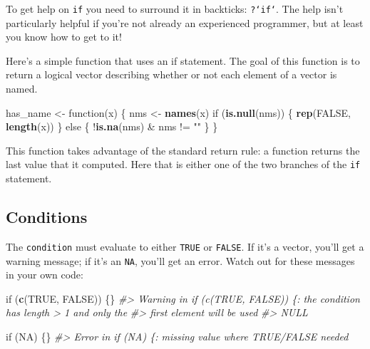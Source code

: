 \documentclass[]{book}
\newenvironment{Shaded}{\begin{snugshade}}{\end{snugshade}}
\newcommand{\KeywordTok}[1]{\textcolor[rgb]{0.13,0.29,0.53}{\textbf{{#1}}}}
\newcommand{\StringTok}[1]{\textcolor[rgb]{0.31,0.60,0.02}{{#1}}}
\newcommand{\CommentTok}[1]{\textcolor[rgb]{0.56,0.35,0.01}{\textit{{#1}}}}
\newcommand{\OtherTok}[1]{\textcolor[rgb]{0.56,0.35,0.01}{{#1}}}
\newcommand{\NormalTok}[1]{{#1}}
\begin{document}
To get help on \texttt{if} you need to surround it in backticks:
\texttt{?`if`}. The help isn't particularly helpful if you're not
already an experienced programmer, but at least you know how to get to
it!

Here's a simple function that uses an if statement. The goal of this
function is to return a logical vector describing whether or not each
element of a vector is named.

\begin{Shaded}
\begin{Highlighting}[]
\NormalTok{has_name <-}\StringTok{ }\NormalTok{function(x) \{}
  \NormalTok{nms <-}\StringTok{ }\KeywordTok{names}\NormalTok{(x)}
  \NormalTok{if (}\KeywordTok{is.null}\NormalTok{(nms)) \{}
    \KeywordTok{rep}\NormalTok{(}\OtherTok{FALSE}\NormalTok{, }\KeywordTok{length}\NormalTok{(x))}
  \NormalTok{\} else \{}
    \NormalTok{!}\KeywordTok{is.na}\NormalTok{(nms) &}\StringTok{ }\NormalTok{nms !=}\StringTok{ ""}
  \NormalTok{\}}
\NormalTok{\}}
\end{Highlighting}
\end{Shaded}

This function takes advantage of the standard return rule: a function
returns the last value that it computed. Here that is either one of the
two branches of the \texttt{if} statement.

\subsection{Conditions}\label{conditions}

The \texttt{condition} must evaluate to either \texttt{TRUE} or
\texttt{FALSE}. If it's a vector, you'll get a warning message; if it's
an \texttt{NA}, you'll get an error. Watch out for these messages in
your own code:

\begin{Shaded}
\begin{Highlighting}[]
\NormalTok{if (}\KeywordTok{c}\NormalTok{(}\OtherTok{TRUE}\NormalTok{, }\OtherTok{FALSE}\NormalTok{)) \{\}}
\CommentTok{#> Warning in if (c(TRUE, FALSE)) \{: the condition has length > 1 and only the}
\CommentTok{#> first element will be used}
\CommentTok{#> NULL}

\NormalTok{if (}\OtherTok{NA}\NormalTok{) \{\}}
\CommentTok{#> Error in if (NA) \{: missing value where TRUE/FALSE needed}
\end{Highlighting}
\end{Shaded}
\end{document}
